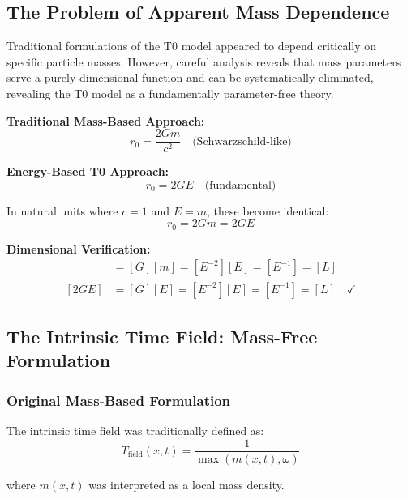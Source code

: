 \documentclass[12pt,a4paper]{report}
\newcommand{\rzero}{r_0}                  %
\begin{document}
	\subsection{The Problem of Apparent Mass Dependence}\label{subsec:mass_problem}
	
	Traditional formulations of the T0 model appeared to depend critically on specific particle masses. However, careful analysis reveals that mass parameters serve a purely dimensional function and can be systematically eliminated, revealing the T0 model as a fundamentally parameter-free theory.
	
	\textbf{Traditional Mass-Based Approach:}
	\begin{equation}
		\rzero = \frac{2Gm}{c^2} \quad \text{(Schwarzschild-like)}
	\end{equation}
	
	\textbf{Energy-Based T0 Approach:}
	\begin{equation}
		\rzero = 2GE \quad \text{(fundamental)}
	\end{equation}
	
	In natural units where $c = 1$ and $E = m$, these become identical:
	\begin{equation}
		\rzero = 2Gm = 2GE
	\end{equation}
	
	\textbf{Dimensional Verification:}
	\begin{align}
		[2Gm] &= [G][m] = [E^{-2}][E] = [E^{-1}] = [L] \\
		[2GE] &= [G][E] = [E^{-2}][E] = [E^{-1}] = [L] \quad \checkmark
	\end{align}
	
	\subsection{The Intrinsic Time Field: Mass-Free Formulation}\label{subsec:time_field_elimination}
	
	\subsubsection{Original Mass-Based Formulation}
	
	The intrinsic time field was traditionally defined as:
	\begin{equation}
		T_{\text{field}}(x,t) = \frac{1}{\max(m(x,t), \omega)}
		\label{eq:time_field_original}
	\end{equation}
	
	where $m(x,t)$ was interpreted as a local mass density.
	
\end{document}
